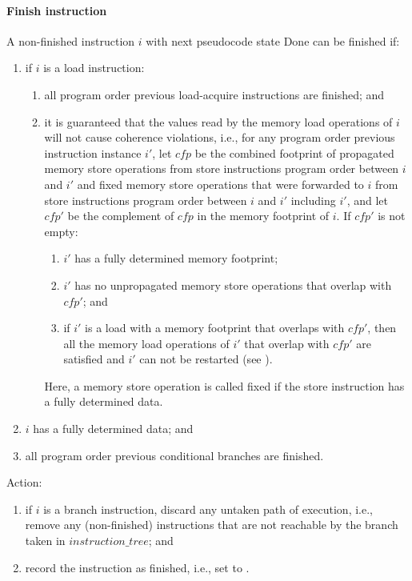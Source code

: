 \paragraph{Finish instruction}\label{omm:thread:finish}
A non-finished instruction $i$ with next pseudocode state {\sc Done} can be finished if:
\begin{enumerate}
\item if $i$ is a load instruction:
  \begin{enumerate}
  \item all program order previous load-acquire instructions are finished; and
  \item it is guaranteed that the values read by the memory load operations of $i$ will not cause coherence violations, i.e., for any program order previous instruction instance $i'$, let $cfp$ be the combined footprint of propagated memory store operations from store instructions program order between $i$ and $i'$ and fixed memory store operations that were forwarded to $i$ from store instructions program order between $i$ and $i'$ including $i'$, and let $cfp'$ be the complement of $cfp$ in the memory footprint of $i$.
  If $cfp'$ is not empty:
    \begin{enumerate}
    \item $i'$ has a fully determined memory footprint;
    \item $i'$ has no unpropagated memory store operations that overlap with $cfp'$; and
    \item if $i'$ is a load with a memory footprint that overlaps with $cfp'$, then all the memory load operations of $i'$ that overlap with $cfp'$ are satisfied and $i'$ can not be restarted (see ).
    \end{enumerate}
  Here, a memory store operation is called fixed if the store instruction has a fully determined data.
  \end{enumerate}
\item $i$ has a fully determined data; and
\item all program order previous conditional branches are finished.
\end{enumerate}
Action:
\begin{enumerate}
\item if $i$ is a branch instruction, discard any untaken path of execution, i.e., remove any (non-finished) instructions that are not reachable by the branch taken in $instruction\_tree$; and
\item record the instruction as finished, i.e., set  to .
\end{enumerate}



